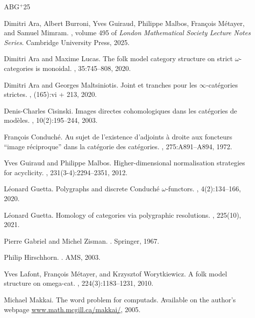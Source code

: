 \documentclass[reqno]{amsart}
\theoremstyle{plain}
\theoremstyle{definition}
\theoremstyle{remark}
\begin{document}
\newcommand{\etalchar}[1]{$^{#1}$}
\begin{thebibliography}{ABG{\etalchar{+}}25}

\bibitem[ABG{\etalchar{+}}25]{abgmmm:polybk}
Dimitri Ara, Albert Burroni, Yves Guiraud, Philippe Malbos, Fran{\c c}ois
  M{\'e}tayer, and Samuel Mimram.
, volume 495 of
  {\em London Mathematical Society Lecture Notes Series}.
\newblock Cambridge University Press, 2025.

Dimitri Ara and Maxime Lucas.
\newblock The folk model category structure on strict $\omega$-categories is
  monoidal.
, 35:745--808, 2020.

Dimitri Ara and Georges Maltsiniotis.
\newblock Joint et tranches pour les {$\infty$}-cat\'egories strictes.
, (165):vi + 213, 2020.

Denis-Charles Cisinski.
\newblock Images directes cohomologiques dans les cat{\'e}gories de
  mod{\`e}les.
, 10(2):195--244, 2003.

Fran{\c c}ois Conduch\'e.
\newblock Au sujet de l'existence d'adjoints \`a{} droite aux foncteurs ``image
  r\'eciproque'' dans la cat\'egorie des cat\'egories.
, 275:A891--A894, 1972.

Yves Guiraud and Philippe Malbos.
\newblock Higher-dimensional normalisation strategies for acyclicity.
, 231(3-4):2294--2351, 2012.

L{\'e}onard Guetta.
\newblock Polygraphs and discrete {C}onduch{\'e} $\omega$-functors.
, 4(2):134--166, 2020.

L{\'e}onard Guetta.
\newblock Homology of categories via polygraphic resolutions.
, 225(10), 2021.

Pierre Gabriel and Michel Zisman.
.
\newblock Springer, 1967.

Philip Hirschhorn.
.
\newblock AMS, 2003.

Yves Lafont, Fran{\c c}ois M{\'e}tayer, and Krzysztof Worytkiewicz.
\newblock A folk model structure on omega-cat.
, 224(3):1183--1231, 2010.

Michael Makkai.
\newblock The word problem for computads.
\newblock Available on the author's webpage \url{www.math.mcgill.ca/makkai/},
  2005.

\end{thebibliography}
\end{document}
